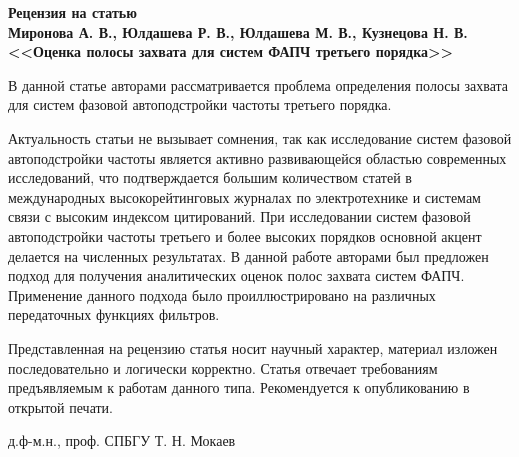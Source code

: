 \documentclass[a4paper,article,14pt]{extarticle}
\begin{document}
\begin{singlespace}
  {\small
    \begin{center}
      \begin{minipage}{0.8\textwidth}
        \begin{center}
          {\normalsize \textbf{Рецензия  на статью}}\\[0.2cm]
          \textbf{Миронова А. В., Юлдашева Р. В., Юлдашева М. В., Кузнецова Н. В. <<Оценка полосы захвата для систем ФАПЧ
третьего порядка>>}
        
        \end{center}
      \end{minipage}
    \end{center}

   В данной статье авторами рассматривается проблема определения полосы захвата для систем фазовой автоподстройки частоты третьего порядка.

   Актуальность статьи не вызывает сомнения, так как исследование систем фазовой автоподстройки частоты является активно развивающейся областью современных исследований, что подтверждается большим количеством статей в международных высокорейтинговых журналах по электротехнике и системам связи с высоким индексом цитирований. При исследовании систем фазовой автоподстройки частоты третьего и более высоких порядков основной акцент делается на  численных результатах. В данной работе авторами был предложен подход для получения аналитических оценок полос захвата систем ФАПЧ. Применение данного подхода было проиллюстрировано на различных передаточных функциях фильтров.

    Представленная на рецензию статья носит научный характер, материал изложен последовательно и логически корректно. Статья отвечает требованиям предъявляемым к работам данного типа. Рекомендуется к опубликованию в открытой печати.

    \vspace{0.2cm}
    \noindent
      \begin{flushright}
      д.ф-м.н., проф. СПБГУ Т. Н. Мокаев
      \end{flushright}
  }
\end{singlespace}
\thispagestyle{empty}
\end{document}
